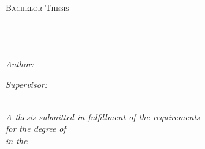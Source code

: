 \documentclass[
11pt, %
english, %
singlespacing, %
headsepline, %
]{MastersDoctoralThesis} %
\author{Carl \textsc{Balmer}} %
\begin{document}
\frontmatter %

\pagestyle{plain} %


\begin{titlepage}
\begin{center}

\textsc{\LARGE \univname}\\[1.5cm] %
\textsc{\Large Bachelor Thesis}\\[0.5cm] %

\HRule \\[0.4cm] %
{\huge \bfseries \ttitle}\\[0.4cm] %
\HRule \\[1.5cm] %
 
\begin{minipage}{0.4\textwidth}
\begin{flushleft} \large
\emph{Author:}\\
\authorname %
\end{flushleft}
\end{minipage}
\begin{minipage}{0.4\textwidth}
\begin{flushright} \large
\emph{Supervisor:} \\
\supname %
\end{flushright}
\end{minipage}\\[3cm]
 
\large \textit{A thesis submitted in fulfillment of the requirements\\ for the degree of \degreename}\\[0.3cm] %
\textit{in the}\\[0.4cm]
\groupname\\\deptname\\[2cm] %
 

\end{center}
\end{titlepage}
\end{document}

